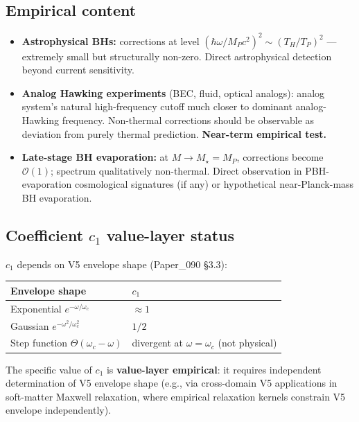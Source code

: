 \documentclass[11pt,a4paper]{article}
\begin{document}
\subsection{Empirical content}

\begin{itemize}[noitemsep]
\item \textbf{Astrophysical BHs:} corrections at level $(\hbar\omega/M_P c^2)^2 \sim (T_H/T_P)^2$ --- extremely small but structurally non-zero. Direct astrophysical detection beyond current sensitivity.
\item \textbf{Analog Hawking experiments} (BEC, fluid, optical analogs): analog system's natural high-frequency cutoff much closer to dominant analog-Hawking frequency. Non-thermal corrections should be observable as deviation from purely thermal prediction. \textbf{Near-term empirical test.}
\item \textbf{Late-stage BH evaporation:} at $M \to M_\star = M_P$, corrections become $\mathcal{O}(1)$; spectrum qualitatively non-thermal. Direct observation in PBH-evaporation cosmological signatures (if any) or hypothetical near-Planck-mass BH evaporation.
\end{itemize}

\subsection{Coefficient $c_1$ value-layer status}

$c_1$ depends on V5 envelope shape (Paper\_090 \S3.3):

\begin{center}
\begin{tabular}{ll}
\toprule
\textbf{Envelope shape} & $c_1$ \\
\midrule
Exponential $e^{-\omega/\omega_c}$ & $\approx 1$ \\
Gaussian $e^{-\omega^2/\omega_c^2}$ & $1/2$ \\
Step function $\Theta(\omega_c - \omega)$ & divergent at $\omega = \omega_c$ (not physical) \\
\bottomrule
\end{tabular}
\end{center}

The specific value of $c_1$ is \textbf{value-layer empirical}: it requires independent determination of V5 envelope shape (e.g., via cross-domain V5 applications in soft-matter Maxwell relaxation, where empirical relaxation kernels constrain V5 envelope independently).
\end{document}
